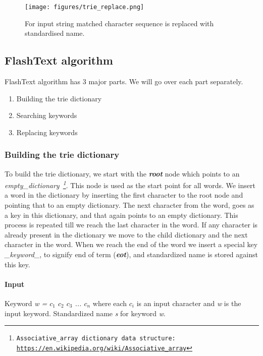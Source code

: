 \begin{figure}[H]
    \centering
    \texttt{[image: figures/trie\_replace.png]}
    \caption{For input string matched character sequence is replaced with standardised name.}
    \label{fig:trie_replace}
\end{figure}

\subsection{FlashText algorithm}
\noindent FlashText algorithm has 3 major parts. We will go over each part separately.
\begin{enumerate}
\item Building the trie dictionary
\item Searching keywords
\item Replacing keywords
\end{enumerate}

\subsubsection{Building the trie dictionary}
To build the trie dictionary, we start with the \textbf{\textit{root}} node which points to an \textit{empty\_dictionary~\footnote{ \texttt{Associative\_array  dictionary data structure: \url{https://en.wikipedia.org/wiki/Associative_array}}}}. This node is used as the start point for all words. We insert a word in the dictionary by inserting the first character to the root node and pointing that to an empty dictionary. The next character from the word, goes as a key in this dictionary, and that again points to an empty dictionary. This process is repeated till we reach the last character in the word. If any character is already present in the dictionary we move to the child dictionary and the next character in the word.
When we reach the end of the word  we insert a special key \textit{\_keyword\_}, to signify end of term (\textbf{\textit{eot}}), and standardized name is stored against this key.

\paragraph*{Input}\hfill\break

\noindent Keyword \textit{w = $c_1$ $c_2$ $c_3$ ... $c_n$} where each \textit{$c_i$} is an input character and \textit{w} is the input keyword.\hfill\break
Standardized name \textit{s} for keyword \textit{w}.
\newpage
